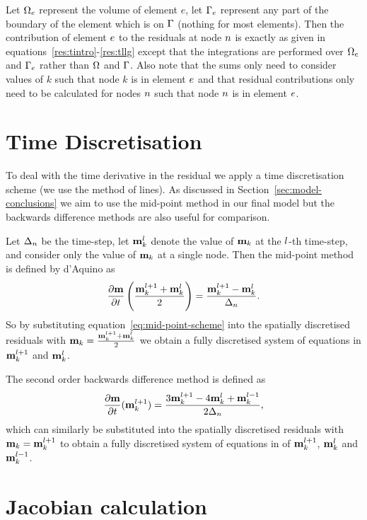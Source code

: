 Let $\Omega_e$ represent the volume of element $e$, let ${\Gamma}_e$ represent any part of the boundary of the element which is on ${\Gamma}$ (nothing for most elements). Then the contribution of element $e$ to the residuals at node $n$ is exactly as given in equations~\eqref{res:tintro}-\eqref{res:tllg} except that the integrations are performed over $\Omega_e$ and ${\Gamma}_e$ rather than $\Omega$ and ${\Gamma}$. Also note that the sums only need to consider values of $k$ such that node $k$ is in element $e$ and that residual contributions only need to be calculated for nodes $n$ such that node $n$ is in element $e$.


\section{Time Discretisation}
\label{sec:time-discretisation-resi}

To deal with the time derivative in the residual we apply a time discretisation scheme (\ie we use the method of lines). As discussed in Section~\ref{sec:model-conclusions} we aim to use the mid-point method in our final model but the backwards difference methods are also useful for comparison.

Let $\Delta_{n}$ be the time-step, let $\mathbf{m}_k^l$ denote the value of $\mathbf{m}_k$ at the $l$-th time-step, and consider only the value of $\mathbf{m}_k$ at a single node. Then the mid-point method is defined by d'Aquino\cite{DAquino2005} as
\begin{equation}
  \label{eq:mid-point-scheme}
  \frac{\partial \mathbf{m}}{\partial t} \left( \frac{\mathbf{m}_k^{l+1} + \mathbf{m}_k^l}{2} \right) = \frac{\mathbf{m}_k^{l+1} - \mathbf{m}_k^l}{ \Delta_{n}}.
\end{equation}
So by substituting equation~\eqref{eq:mid-point-scheme} into  the spatially discretised residuals with $\mathbf{m}_k = \frac{\mathbf{m}_k^{l+1} + \mathbf{m}^l_k}{2}$ we obtain a fully discretised system of equations in  $\mathbf{m}_k^{l+1}$ and $\mathbf{m}_k^l$.

The second order backwards difference method is defined as\cite{Atkinson2009}
\begin{equation}
  \label{eq:bdf2-scheme}
  \frac{\partial \mathbf{m}}{\partial t}(\mathbf{m}_k^{l+1}) = \frac{3 \mathbf{m}_k^{l+1} - 4 \mathbf{m}_k^{l} + \mathbf{m}_k^{l-1}}{2\Delta_{n}},
\end{equation}
which can similarly be substituted into the spatially discretised residuals with $\mathbf{m}_k = \mathbf{m}_k^{l+1}$ to obtain a fully discretised system of equations in of $\mathbf{m}_k^{l+1}$, $\mathbf{m}_k^l$ and $\mathbf{m}_k^{l-1}$.


\section{Jacobian calculation}
\label{sec:llg-jacobian-calculation}

